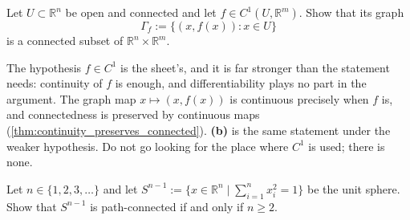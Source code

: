 \begin{exercise}
\label{ex:connected_graphs}
Let $U \subset \mathbb{R}^n$ be open and connected and let $f \in C^1(U, \mathbb{R}^m)$. Show that
its graph
\[\Gamma_f := \{(x, f(x)) : x \in U\}\]
is a connected subset of $\mathbb{R}^n \times \mathbb{R}^m$.
\end{exercise}

\begin{ainote}
The hypothesis $f \in C^1$ is the sheet's, and it is far stronger than the statement needs:
continuity of $f$ is enough, and differentiability plays no part in the argument. The graph map
$x \mapsto (x,f(x))$ is continuous precisely when $f$ is, and connectedness is preserved by
continuous maps (\cref{thm:continuity_preserves_connected}). \textbf{(b)}
is the same statement under the weaker hypothesis. Do not go looking for the place where
$C^1$ is used; there is none.
\end{ainote}

\begin{exercise}
\label{ex:sphere_path_connected}
Let $n \in \{1,2,3,\dots\}$ and let
$S^{n-1} := \{x \in \mathbb{R}^n \mid \sum_{i=1}^n x_i^2 = 1\}$ be the unit sphere. Show that
$S^{n-1}$ is path-connected if and only if $n \ge 2$.
\end{exercise}
